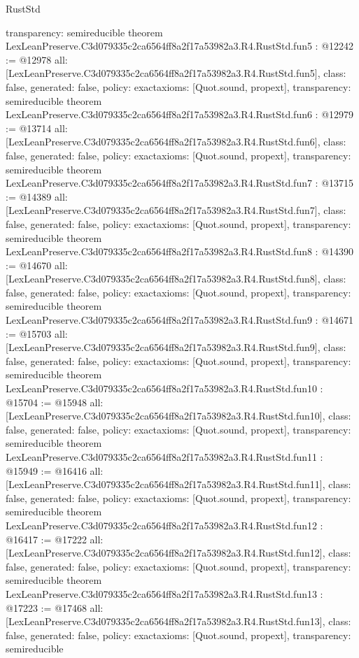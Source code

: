 \begin{lexlean}{RustStd}
\begin{coremodule}
{  transparency: semireducible
}
theorem LexLeanPreserve.C3d079335c2ca6564ff8a2f17a53982a3.R4.RustStd.fun5 : @12242 := @12978 {
  all: [LexLeanPreserve.C3d079335c2ca6564ff8a2f17a53982a3.R4.RustStd.fun5],
  class: false,
  generated: false,
  policy: exact{axioms: [Quot.sound, propext]},
  transparency: semireducible
}
theorem LexLeanPreserve.C3d079335c2ca6564ff8a2f17a53982a3.R4.RustStd.fun6 : @12979 := @13714 {
  all: [LexLeanPreserve.C3d079335c2ca6564ff8a2f17a53982a3.R4.RustStd.fun6],
  class: false,
  generated: false,
  policy: exact{axioms: [Quot.sound, propext]},
  transparency: semireducible
}
theorem LexLeanPreserve.C3d079335c2ca6564ff8a2f17a53982a3.R4.RustStd.fun7 : @13715 := @14389 {
  all: [LexLeanPreserve.C3d079335c2ca6564ff8a2f17a53982a3.R4.RustStd.fun7],
  class: false,
  generated: false,
  policy: exact{axioms: [Quot.sound, propext]},
  transparency: semireducible
}
theorem LexLeanPreserve.C3d079335c2ca6564ff8a2f17a53982a3.R4.RustStd.fun8 : @14390 := @14670 {
  all: [LexLeanPreserve.C3d079335c2ca6564ff8a2f17a53982a3.R4.RustStd.fun8],
  class: false,
  generated: false,
  policy: exact{axioms: [Quot.sound, propext]},
  transparency: semireducible
}
theorem LexLeanPreserve.C3d079335c2ca6564ff8a2f17a53982a3.R4.RustStd.fun9 : @14671 := @15703 {
  all: [LexLeanPreserve.C3d079335c2ca6564ff8a2f17a53982a3.R4.RustStd.fun9],
  class: false,
  generated: false,
  policy: exact{axioms: [Quot.sound, propext]},
  transparency: semireducible
}
theorem LexLeanPreserve.C3d079335c2ca6564ff8a2f17a53982a3.R4.RustStd.fun10 : @15704 := @15948 {
  all: [LexLeanPreserve.C3d079335c2ca6564ff8a2f17a53982a3.R4.RustStd.fun10],
  class: false,
  generated: false,
  policy: exact{axioms: [Quot.sound, propext]},
  transparency: semireducible
}
theorem LexLeanPreserve.C3d079335c2ca6564ff8a2f17a53982a3.R4.RustStd.fun11 : @15949 := @16416 {
  all: [LexLeanPreserve.C3d079335c2ca6564ff8a2f17a53982a3.R4.RustStd.fun11],
  class: false,
  generated: false,
  policy: exact{axioms: [Quot.sound, propext]},
  transparency: semireducible
}
theorem LexLeanPreserve.C3d079335c2ca6564ff8a2f17a53982a3.R4.RustStd.fun12 : @16417 := @17222 {
  all: [LexLeanPreserve.C3d079335c2ca6564ff8a2f17a53982a3.R4.RustStd.fun12],
  class: false,
  generated: false,
  policy: exact{axioms: [Quot.sound, propext]},
  transparency: semireducible
}
theorem LexLeanPreserve.C3d079335c2ca6564ff8a2f17a53982a3.R4.RustStd.fun13 : @17223 := @17468 {
  all: [LexLeanPreserve.C3d079335c2ca6564ff8a2f17a53982a3.R4.RustStd.fun13],
  class: false,
  generated: false,
  policy: exact{axioms: [Quot.sound, propext]},
  transparency: semireducible
}
\end{coremodule}
\end{lexlean}
